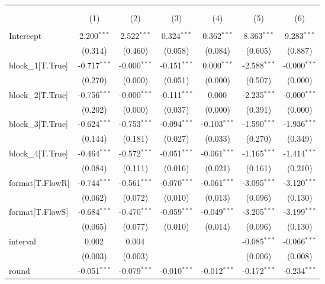 \begin{table}[!htbp] \centering
\begin{tabular}{@{\extracolsep{5pt}}lcccccc}
\\[-1.8ex]\hline
\hline \\[-1.8ex]
\\[-1.8ex] & (1) & (2) & (3) & (4) & (5) & (6) \\
\hline \\[-1.8ex]
 Intercept & 2.200$^{***}$ & 2.522$^{***}$ & 0.324$^{***}$ & 0.362$^{***}$ & 8.363$^{***}$ & 9.283$^{***}$ \\
& (0.314) & (0.460) & (0.058) & (0.084) & (0.605) & (0.887) \\
 block_1[T.True] & -0.717$^{***}$ & -0.000$^{***}$ & -0.151$^{***}$ & 0.000$^{***}$ & -2.588$^{***}$ & -0.000$^{***}$ \\
& (0.270) & (0.000) & (0.051) & (0.000) & (0.507) & (0.000) \\
 block_2[T.True] & -0.756$^{***}$ & -0.000$^{***}$ & -0.111$^{***}$ & 0.000$^{}$ & -2.235$^{***}$ & -0.000$^{***}$ \\
& (0.202) & (0.000) & (0.037) & (0.000) & (0.391) & (0.000) \\
 block_3[T.True] & -0.624$^{***}$ & -0.753$^{***}$ & -0.094$^{***}$ & -0.103$^{***}$ & -1.590$^{***}$ & -1.936$^{***}$ \\
& (0.144) & (0.181) & (0.027) & (0.033) & (0.270) & (0.349) \\
 block_4[T.True] & -0.464$^{***}$ & -0.572$^{***}$ & -0.051$^{***}$ & -0.061$^{***}$ & -1.165$^{***}$ & -1.414$^{***}$ \\
& (0.084) & (0.111) & (0.016) & (0.021) & (0.161) & (0.210) \\
 format[T.FlowR] & -0.744$^{***}$ & -0.561$^{***}$ & -0.070$^{***}$ & -0.061$^{***}$ & -3.095$^{***}$ & -3.120$^{***}$ \\
& (0.062) & (0.072) & (0.010) & (0.013) & (0.096) & (0.130) \\
 format[T.FlowS] & -0.684$^{***}$ & -0.470$^{***}$ & -0.059$^{***}$ & -0.049$^{***}$ & -3.205$^{***}$ & -3.199$^{***}$ \\
& (0.065) & (0.077) & (0.010) & (0.014) & (0.096) & (0.130) \\
 interval & 0.002$^{}$ & 0.004$^{}$ & & & -0.085$^{***}$ & -0.066$^{***}$ \\
& (0.003) & (0.003) & & & (0.006) & (0.008) \\
 round & -0.051$^{***}$ & -0.079$^{***}$ & -0.010$^{***}$ & -0.012$^{***}$ & -0.172$^{***}$ & -0.234$^{***}$ \\

\end{tabular}
\end{table}

